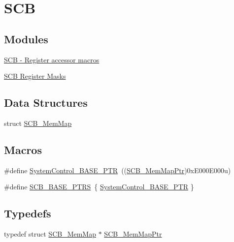 \hypertarget{group___s_c_b___peripheral}{}\section{S\+C\+B}
\label{group___s_c_b___peripheral}
\subsection*{Modules}
\begin{DoxyCompactItemize}
\item 
\hyperlink{group___s_c_b___register___accessor___macros}{S\+C\+B -\/ Register accessor macros}
\item 
\hyperlink{group___s_c_b___register___masks}{S\+C\+B Register Masks}
\end{DoxyCompactItemize}
\subsection*{Data Structures}
\begin{DoxyCompactItemize}
\item 
struct \hyperlink{struct_s_c_b___mem_map}{S\+C\+B\+\_\+\+Mem\+Map}
\end{DoxyCompactItemize}
\subsection*{Macros}
\begin{DoxyCompactItemize}
\item 
\#define \hyperlink{group___s_c_b___peripheral_gaf22864785770f832103e904244e078cb}{System\+Control\+\_\+\+B\+A\+S\+E\+\_\+\+P\+T\+R}~((\hyperlink{group___s_c_b___peripheral_ga08aca299c99cac47121d9e64e7b8e1cf}{S\+C\+B\+\_\+\+Mem\+Map\+Ptr})0x\+E000\+E000u)
\item 
\#define \hyperlink{group___s_c_b___peripheral_gaf74b4dbfa6fd0a5607314e170a0c1d48}{S\+C\+B\+\_\+\+B\+A\+S\+E\+\_\+\+P\+T\+R\+S}~\{ \hyperlink{group___s_c_b___peripheral_gaf22864785770f832103e904244e078cb}{System\+Control\+\_\+\+B\+A\+S\+E\+\_\+\+P\+T\+R} \}
\end{DoxyCompactItemize}
\subsection*{Typedefs}
\begin{DoxyCompactItemize}
\item 
typedef struct \hyperlink{struct_s_c_b___mem_map}{S\+C\+B\+\_\+\+Mem\+Map} $\ast$ \hyperlink{group___s_c_b___peripheral_ga08aca299c99cac47121d9e64e7b8e1cf}{S\+C\+B\+\_\+\+Mem\+Map\+Ptr}
\end{DoxyCompactItemize}


